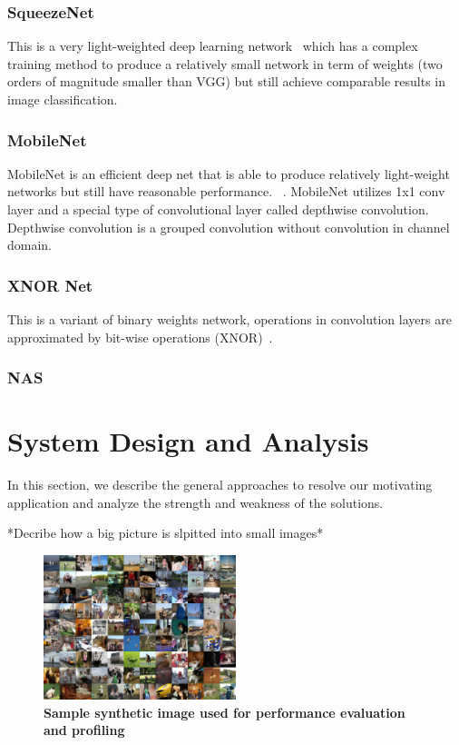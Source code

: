 \documentclass[conference]{IEEEtran}
\begin{document}
\subsubsection{SqueezeNet}
This is a very light-weighted deep learning network~\cite{shen2018cs} which has a complex training method to produce a relatively small network in term of weights (two orders of magnitude smaller than VGG) but still achieve comparable results in image classification.

\subsubsection{MobileNet}
MobileNet is an efficient deep net that is able to produce relatively light-weight networks but still have reasonable performance. ~\cite{howard2017mobilenets}. MobileNet utilizes 1x1 conv layer and a special type of convolutional layer called depthwise convolution. Depthwise convolution is a grouped convolution without convolution in channel domain.

\subsubsection{XNOR Net}
This is a variant of binary weights network, operations in convolution layers are approximated by bit-wise operations (XNOR)~\cite{rastegari2016xnor}.

\subsubsection{NAS }


\section{System Design and Analysis}
In this section, we describe the general approaches to resolve our motivating application and analyze the strength and weakness of the solutions.

*Decribe how a big picture is slpitted into small images*
\begin{figure}[htpb]
	  \centering
	  \includegraphics[width=0.5\textwidth]{sample_image}
	  \caption{\textbf{Sample synthetic image used for  performance evaluation and profiling}}
	  \label{fig:sapmle_image}
\end{figure}
\end{document}
